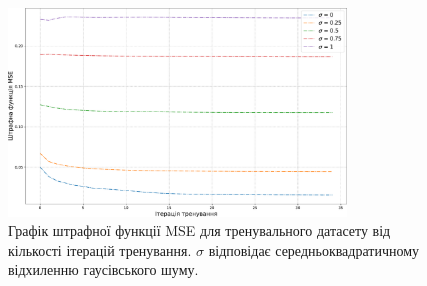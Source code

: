 \documentclass[14pt,a4paper]{extarticle}
\newcounter{e}
\numberwithin{equation}{section}
\numberwithin{figure}{section}
\begin{document}
	\begin{figure}[H]
		\centering
		\includegraphics[width=0.8\textwidth]{../resources/awgn-train-loss-comparation.pdf}
		\caption{Графік штрафної функції MSE для тренувального датасету від кількості ітерацій тренування. $\sigma$ відповідає середньоквадратичному відхиленню гаусівського шуму.}
		\label{fig:awgn-loss-ssim-comparation}
	\end{figure}
		

	\newpage
	\thispagestyle{empty}
	\printbibliography[title={Література}]

\end{document}
